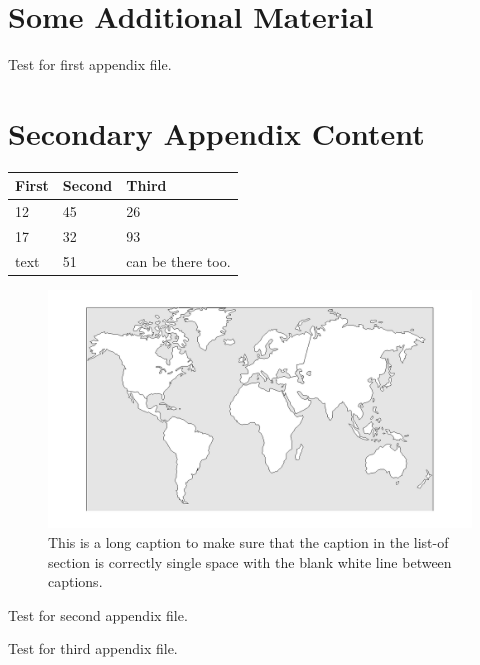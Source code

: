 \chapter{Some Additional Material}

Test for first appendix file.

\chapter{Secondary Appendix Content}

\begin{table}[htbp]%
    \label{first}
    \begin{tabularx}{6.5in}{XXX}
      \hline
      First & Second & Third \\
      \hline
      12 & 45 & 26 \\
      17 & 32 & 93 \\
      text & 51 & can be there too. \\	
      \hline
    \end{tabularx}
\end{table}


\begin{figure}[h]
    \centering
    \includegraphics[scale=.2]{graphics/theworld.png}
    \caption[Figure Caption]{This is a long caption to make sure that the caption in the list-of section is correctly single space with the blank white line between captions. }
    \label{fig:my_label}
\end{figure}

Test for second appendix file.



Test for third appendix file.



